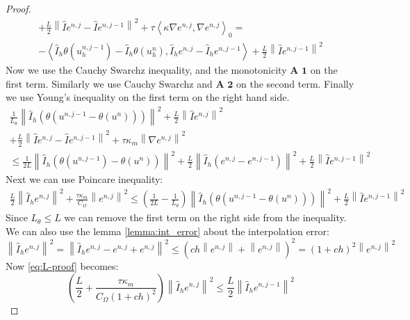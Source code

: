 \documentclass[../Main/main.tex]{subfiles}
\begin{document}
\begin{proof}
\begin{equation}
\begin{gathered}
				 + \frac{L}{2}\left \| \hat{I} e^{n,j}-\hat{I}e^{n,j-1} \right \|^2 + 
				\tau \left \langle \kappa\nabla e^{n,j},\nabla e^{n,j} \right \rangle_0  = \\ - \left \langle \hat{I}_h \theta(u^{n,j-1}_h) - \hat{I}_h \theta(u^{n}_h),\hat{I}_h e^{n,j} - \hat{I}_h e^{n,j-1}\right \rangle+\frac{L}{2}\left \| \hat{I} e^{n,j-1}\right \|^2
			\end{gathered}
		\end{equation}
		Now we use the Cauchy Swarchz inequality, and the monotonicity $\textbf{A 1}$ on the first term. Similarly we use Cauchy Swarchz and $\textbf{A 2}$ on the second term. Finally we use Young's inequality on the first term on the right hand side.
		\begin{equation}
			\begin{gathered}
				\frac{1}{L_{\theta}}\left \| \hat{I}_h (\theta(u^{n,j-1}-\theta(u^{n}))) \right \|^2 + \frac{L}{2}\left \| \hat{I} e^{n,j}\right \|^2 \\
				+ \frac{L}{2}\left \| \hat{I} e^{n,j}-\hat{I}e^{n,j-1} \right \|^2 + \tau \kappa_m \left \| \nabla e^{n,j} \right \|^2 \\
				\leq \frac{1}{2L} \left \| \hat{I}_h(\theta (u^{n,j-1})-\theta (u^n) ) \right \|^2  + \frac{L}{2} \left \|\hat{I}_h( e^{n,j} - e^{n,j-1}) \right \|^2+\frac{L}{2}\left \| \hat{I} e^{n,j-1}\right \|^2
			\end{gathered}
		\end{equation} 
		Next we can use Poincare inequality:
		\begin{equation}\label{eq:L-proof}
			\begin{gathered}
				\frac{L}{2}\left \| \hat{I}_h e^{n,j}\right\|^2 + \frac{\tau \kappa_m}{C_{\Omega}} \left \|e^{n,j} \right \|^2 \leq (\frac{1}{2L} - \frac{1}{L_{\theta}}) \left \| \hat{I}_h(\theta (u^{n,j-1}-\theta (u^n))) \right \|^2 +\frac{L}{2}\left \| \hat{I} e^{n,j-1}\right \|^2
			\end{gathered}
		\end{equation}
		Since $L_{\theta} \leq L$ we can remove the first term on the right side from the inequality. We can also use the lemma \ref{lemma:int_error} about the interpolation error:
		\begin{equation}
			\left \| \hat{I}_h e^{n,j} \right \|^2 = \left \| \hat{I}_h e^{n,j} - e^{n,j} + e^{n,j} \right \|^2 \leq (ch\left \| e^{n,j}\right \| + \left \| e^{n,j} \right \|)^2=(1+ch)^2\left \| e^{n,j} \right \|^2
		\end{equation}
		Now \eqref{eq:L-proof} becomes:
		\begin{equation}
			(\frac{L}{2}+\frac{\tau \kappa_m }{C_{\Omega}(1 + ch)^2})\left \| \hat{I}_h e^{n,j} \right \|^2 \leq \frac{L}{2} \left \| \hat{I}_h e^{n,j-1}\right \|^2
		\end{equation}
	\end{proof}
	
\end{document}

